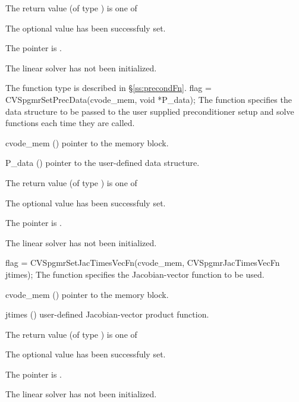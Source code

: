 {
  The return value  (of type ) is one of
  \begin{args}
  \item[\Id{SUCCESS}] 
    The optional value has been successfuly set.
  \item[\Id{LIN\_NO\_MEM}]
    The  pointer is .
  \item[\Id{LIN\_NO\_LMEM}]
    The {\cvspgmr} linear solver has not been initialized.
  \end{args}
}
{
   The function type  is described in \S\ref{ss:precondFn}.
}
{
  flag = CVSpgmrSetPrecData(cvode\_mem, void *P\_data);
}
{
  The function  specifies the data structure
  to be passed to the user supplied preconditioner setup and solve
  functions each time they are called.
}
{
  \begin{args}
  \item[cvode\_mem] ()
    pointer to the {\cvode} memory block.
  \item[P\_data] ()
     pointer to the user-defined data structure.
  \end{args}
}
{
  The return value  (of type ) is one of
  \begin{args}
  \item[\Id{SUCCESS}] 
    The optional value has been successfuly set.
  \item[\Id{LIN\_NO\_MEM}]
    The  pointer is .
  \item[\Id{LIN\_NO\_LMEM}]
    The {\cvspgmr} linear solver has not been initialized.
  \end{args}
}
{}
{
  flag = CVSpgmrSetJacTimesVecFn(cvode\_mem, CVSpgmrJacTimesVecFn jtimes);
}
{
  The function  specifies the Jacobian-vector 
  function to be used.
}
{
  \begin{args}
  \item[cvode\_mem] ()
    pointer to the {\cvode} memory block.
  \item[jtimes] ()
    user-defined Jacobian-vector product function.
  \end{args}
}
{
  The return value  (of type ) is one of
  \begin{args}
  \item[\Id{SUCCESS}] 
    The optional value has been successfuly set.
  \item[\Id{LIN\_NO\_MEM}]
    The  pointer is .
  \item[\Id{LIN\_NO\_LMEM}]
    The {\cvspgmr} linear solver has not been initialized.
  \end{args}
}
